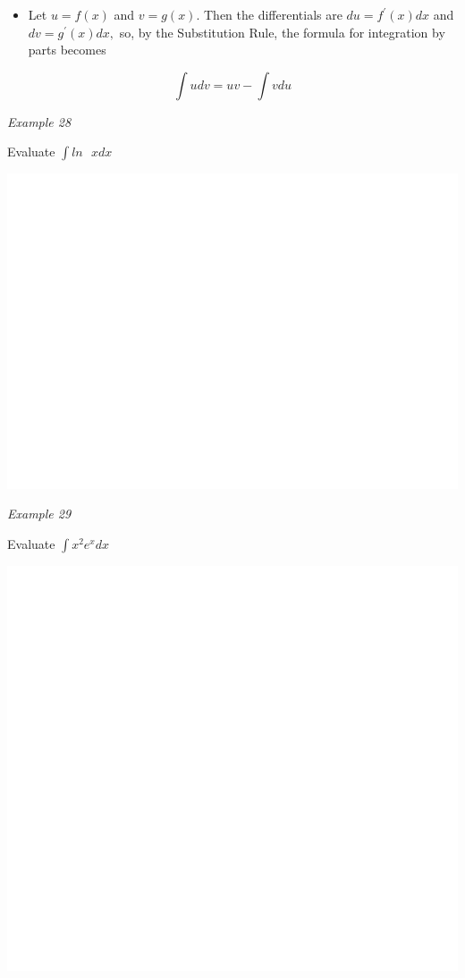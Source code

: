 \documentclass[]{book}
\providecommand{\tightlist}{%
  \setlength{\itemsep}{0pt}\setlength{\parskip}{0pt}}
\begin{document}
\begin{itemize}
\tightlist
\item
  Let \(u = f(x)\) and \(v=g(x)\). Then the differentials are \(du = f^\prime (x) dx\) and \(dv = g^\prime(x) dx,\) so, by the Substitution Rule, the formula for integration by parts becomes
\end{itemize}

\[\int udv = uv-\int vdu\]

\emph{Example 28}

Evaluate \(\int ln \text{ } x dx\)

\begin{center}\includegraphics[width=1\linewidth]{figure/LB47-1} \end{center}

\emph{Example 29}

Evaluate \(\int x^2e^x dx\)

\begin{center}\includegraphics[width=1\linewidth]{figure/LB48-1} \end{center}
\end{document}
